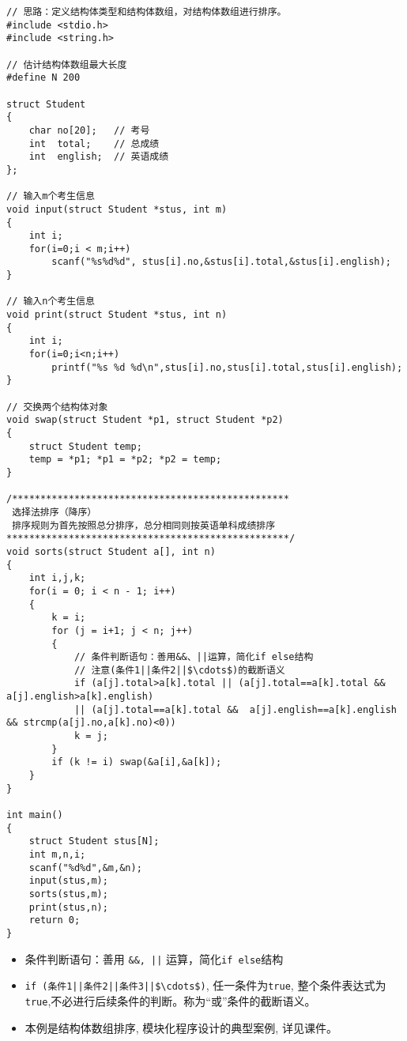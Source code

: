 \begin{lstlisting}
// 思路：定义结构体类型和结构体数组，对结构体数组进行排序。 
#include <stdio.h>
#include <string.h>

// 估计结构体数组最大长度 
#define N 200

struct Student 
{
	char no[20];   // 考号 
	int  total;    // 总成绩 
	int  english;  // 英语成绩  
};

// 输入m个考生信息
void input(struct Student *stus, int m)
{
	int i;
	for(i=0;i < m;i++) 
		scanf("%s%d%d",	stus[i].no,&stus[i].total,&stus[i].english); 
}

// 输入n个考生信息
void print(struct Student *stus, int n)
{
	int i;
	for(i=0;i<n;i++) 
		printf("%s %d %d\n",stus[i].no,stus[i].total,stus[i].english); 
}

// 交换两个结构体对象 
void swap(struct Student *p1, struct Student *p2)
{
	struct Student temp;
	temp = *p1; *p1 = *p2; *p2 = temp;
}

/************************************************* 
 选择法排序（降序）
 排序规则为首先按照总分排序，总分相同则按英语单科成绩排序
**************************************************/ 
void sorts(struct Student a[], int n)
{
	int i,j,k;
	for(i = 0; i < n - 1; i++)
	{
		k = i;
		for (j = i+1; j < n; j++)
		{
			// 条件判断语句：善用&&、||运算，简化if else结构 
			// 注意(条件1||条件2||$\cdots$)的截断语义
			if (a[j].total>a[k].total || (a[j].total==a[k].total &&  a[j].english>a[k].english)
			|| (a[j].total==a[k].total &&  a[j].english==a[k].english && strcmp(a[j].no,a[k].no)<0))  
			k = j;
		}
		if (k != i) swap(&a[i],&a[k]);
	} 
}

int main()
{
	struct Student stus[N]; 
	int m,n,i;
	scanf("%d%d",&m,&n);
	input(stus,m); 
	sorts(stus,m);
	print(stus,n);
	return 0;
}
\end{lstlisting}

\begin{note}[要点]
	\begin{itemize}
		\item 条件判断语句：善用 \lstinline$&&, ||$ 运算，简化\lstinline|if else|结构
		\item \lstinline!if (条件1||条件2||条件3||$\cdots$)!, 任一条件为\lstinline|true|, 整个条件表达式为\lstinline|true|,不必进行后续条件的判断。称为``或''条件的截断语义。
		\item 本例是结构体数组排序, 模块化程序设计的典型案例,  详见课件。 
	\end{itemize}
\end{note}

